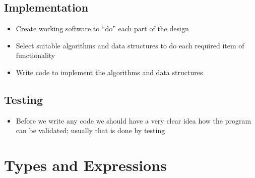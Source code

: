 \documentclass{article}
\begin{document}
\subsection{Implementation}
\begin{itemize}
    \item Create working software to ``do'' each part of the design
    \item Select suitable algorithms and data structures to do each required item of functionality
    \item Write code to implement the algorithms and data structures
\end{itemize}
\subsection{Testing}
\begin{itemize}
    \item Before we write any code we should have a very clear idea how the program can be validated; usually that is done by testing
\end{itemize}
\section{Types and Expressions}
\end{document}
